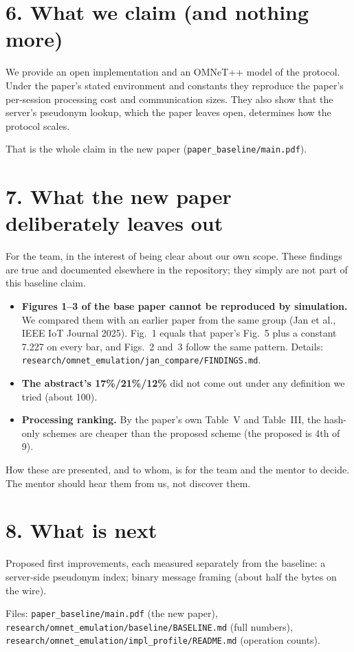 \documentclass[11pt]{article}
\begin{document}
\section*{6. What we claim (and nothing more)}
\begin{key}
We provide an open implementation and an OMNeT++ model of the protocol. Under the paper's stated environment and constants they reproduce the paper's per-session processing cost and communication sizes. They also show that the server's pseudonym lookup, which the paper leaves open, determines how the protocol scales.
\end{key}
That is the whole claim in the new paper (\texttt{paper\_baseline/main.pdf}).

\section*{7. What the new paper deliberately leaves out}
For the team, in the interest of being clear about our own scope. These findings are true and documented elsewhere in the repository; they simply are not part of this baseline claim.
\begin{itemize}[leftmargin=1.4em,itemsep=2pt]
\item \textbf{Figures 1--3 of the base paper cannot be reproduced by simulation.} We compared them with an earlier paper from the same group (Jan et al., IEEE IoT Journal 2025). Fig.~1 equals that paper's Fig.~5 plus a constant 7.227 on every bar, and Figs.~2 and~3 follow the same pattern. Details: \texttt{research/omnet\_emulation/jan\_compare/FINDINGS.md}.
\item \textbf{The abstract's 17\%/21\%/12\%} did not come out under any definition we tried (about 100).
\item \textbf{Processing ranking.} By the paper's own Table~V and Table~III, the hash-only schemes are cheaper than the proposed scheme (the proposed is 4th of 9).
\end{itemize}
How these are presented, and to whom, is for the team and the mentor to decide. The mentor should hear them from us, not discover them.

\section*{8. What is next}
Proposed first improvements, each measured separately from the baseline: a server-side pseudonym index; binary message framing (about half the bytes on the wire).

\vfill\small Files: \texttt{paper\_baseline/main.pdf} (the new paper), \texttt{research/omnet\_emulation/baseline/BASELINE.md} (full numbers), \texttt{research/omnet\_emulation/impl\_profile/README.md} (operation counts).
\end{document}
